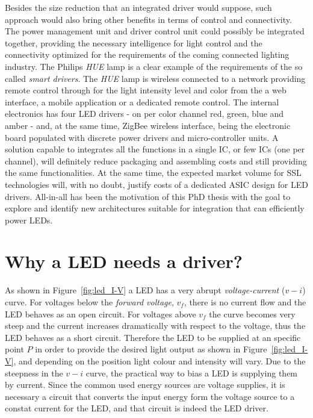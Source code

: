 Besides the size reduction that an integrated driver would suppose, such approach would also bring other benefits in terms of control and connectivity.  The power management unit and driver control unit could possibly be integrated together, providing the necessary intelligence for light control and the connectivity optimized for the requirements of the coming connected lighting industry. The Philips \emph{HUE} lamp is a clear example of the requirements of the so called \emph{smart drivers}. The \emph{HUE} lamp is wireless connected to a network providing remote control through for the light intensity level and color from the a web interface, a mobile application or a dedicated remote control. The internal electronics has four LED drivers - on per color channel red, green, blue and amber - and, at the same time, ZigBee wireless interface, being the electronic board populated with discrete power drivers and micro-controller units. A solution capable to integrates all the functions in a single IC, or few ICs (one per channel), will definitely reduce packaging and assembling costs and still providing the same functionalities. At the same time, the expected market volume for SSL technologies will, with no doubt,  justify costs of a dedicated ASIC design for LED drivers. All-in-all has been the motivation of this PhD thesis with  the goal to explore and identify new architectures suitable for  integration that can efficiently power LEDs.



\section{Why a LED needs a driver?}

As shown in Figure~\ref{fig:led_I-V} a LED has a very abrupt \emph{voltage-current} ($v-i$) curve. For voltages below the \emph{forward voltage}, $v_{f}$, there is no current flow and the LED behaves as an open circuit. For voltages above $v_{f}$ the curve becomes very steep and the current increases dramatically with respect to the voltage, thus the LED behaves as a short circuit. Therefore the LED to be supplied at an specific point $P$  in order to provide the desired light output as shown in Figure~\ref{fig:led_I-V}, and depending on the position light colour and intensity will vary. Due to the steepness in the $v-i$ curve, the practical way to bias a LED is supplying them by current. Since the common used energy sources are voltage supplies, it is necessary a circuit that converts the input energy form the voltage source to a constat current for the LED, and that circuit is indeed the LED driver.

